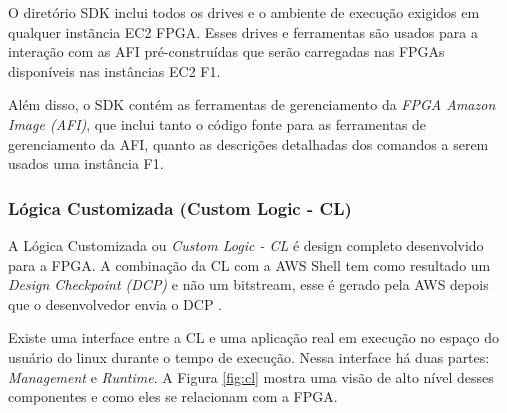     O diretório SDK inclui todos os drives e o ambiente de execução exigidos em qualquer instãncia EC2 FPGA. Esses drives e ferramentas são usados para a interação com as AFI pré-construídas que serão carregadas nas FPGAs disponíveis nas instâncias EC2 F1.
    
    Além disso, o SDK contém as ferramentas de gerenciamento da \textit{FPGA Amazon Image (AFI)}, que inclui tanto o código fonte para as ferramentas de gerenciamento da AFI, quanto as descrições detalhadas dos comandos a serem usados  uma instância F1.
    

     
\subsubsection{Lógica Customizada (Custom Logic - CL)} \label{sec:cl}

A Lógica Customizada ou \textit{Custom Logic - CL} é design completo desenvolvido para a FPGA. A combinação da CL com a AWS Shell tem como resultado um \textit{Design Checkpoint (DCP)} e não um bitstream, esse é gerado pela AWS depois que o desenvolvedor envia o DCP \cite{awsfaq}. 

Existe uma interface entre a CL e uma aplicação real em execução no espaço do usuário do linux durante o tempo de execução. Nessa interface há duas partes: \textit{Management} e \textit{Runtime}. A Figura \ref{fig:cl} mostra uma visão de alto nível desses componentes e como eles se relacionam com a FPGA.

\begin{figure}[htb!] 
   	    \captionsetup{width=15cm}%
\end{figure}

